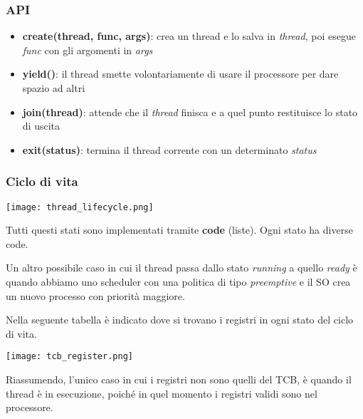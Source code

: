 \subsubsection{API}
\begin{itemize}
	\item \textbf{create(thread, func, args)}: crea un thread e lo salva in \emph{thread}, poi esegue \emph{func} con gli argomenti in \emph{args}
	\item \textbf{yield()}: il thread smette volontariamente di usare il processore per dare spazio ad altri
	\item \textbf{join(thread)}: attende che il \emph{thread} finisca e a quel punto restituisce lo stato di uscita
	\item \textbf{exit(status)}: termina il thread corrente con un determinato \emph{status} 
\end{itemize}

\subsubsection{Ciclo di vita}
\begin{center}
	\texttt{[image: thread\_lifecycle.png]}
\end{center}
Tutti questi stati sono implementati tramite \textbf{code} (liste). Ogni stato ha diverse code.
\begin{note}
	Un altro possibile caso in cui il thread passa dallo stato \emph{running} a quello \textit{ready} è quando abbiamo uno scheduler con una politica di tipo \textit{preemptive} e il SO crea un nuovo processo con priorità maggiore.
\end{note}

Nella seguente tabella è indicato dove si trovano i registri in ogni stato del ciclo di vita. 
\begin{center}
	\texttt{[image: tcb\_register.png]}
\end{center}
Riassumendo, l'unico caso in cui i registri non sono quelli del TCB, è quando il thread è in esecuzione, poiché in quel momento i registri validi sono nel processore.
